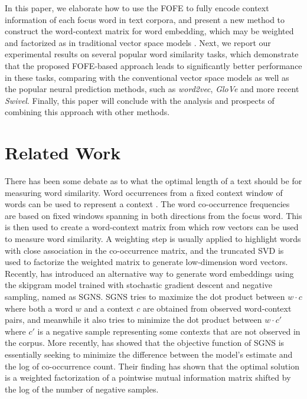 \documentclass[11pt,letterpaper]{article}
\begin{document}
In this paper, we elaborate how to use the FOFE to fully encode context information of each focus word in text corpora, and present a new method to construct the word-context matrix for word embedding, which may be weighted and factorized as in traditional vector space models \cite{Turney2010}. Next, we report our  experimental results on several popular word similarity tasks, which demonstrate that the proposed FOFE-based approach leads to significantly better performance in these tasks, comparing with the conventional vector space models as well as the popular neural prediction methods, such as {\it word2vec}, {\it GloVe} and more recent {\it Swivel}.  Finally, this paper will conclude 
with the analysis and prospects of combining this approach with other methods.

\section{Related Work}

There has been some debate as to what the optimal length of a text should be for measuring word similarity. Word occurrences from a fixed context window of words can be used to represent a context  \cite{Lund}. The word co-occurrence frequencies are based on fixed windows spanning in both directions from the focus word.  This is then used to create a word-context matrix from which row vectors can be used to measure word similarity. A weighting step is usually applied to highlight words with close association in the co-occurrence matrix, and the truncated SVD is used to factorize the weighted matrix to generate low-dimension word vectors. 
Recently, \cite{mikolov2013efficient} has introduced an alternative way to generate word embeddings using the skipgram model trained with stochastic gradient descent and negative sampling, named as SGNS. SGNS tries to maximize the dot product between $w \cdot c$ where both a word $w$ and a context $c$ are obtained from observed word-context pairs, and meanwhile it also tries to minimize the dot product between $w \cdot c'$ where $c'$ is a negative sample representing some contexts that are not observed in the corpus. More recently, \cite{levy2014} has showed that the objective function of SGNS is essentially seeking to minimize the difference between the model’s estimate and the log of co-occurrence count. Their finding has shown that the optimal solution is a weighted factorization of a pointwise mutual information matrix shifted by the log of the number of negative samples. 
\end{document}
